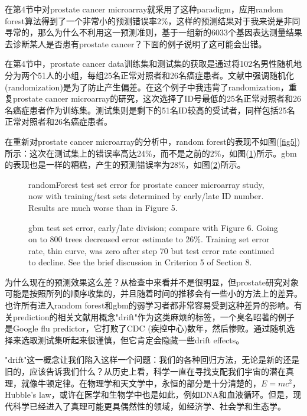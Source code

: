 \documentclass[lang=cn,11pt,a4paper,cite=authoryear]{elegantpaper}
\begin{document}
在第4节中对prostate cancer microarray就采用了这种paradigm，应用random forest算法得到了一个非常小的预测错误率2\%，这样的预测结果对于我来说是非同寻常的，那么为什么不利用这一预测准则，基于一组新的6033个基因表达测量结果去诊断某人是否患有prostate cancer？下面的例子说明了这可能会出错。

在第4节中，prostate cancer data训练集和测试集的获取是通过将102名男性随机地分为两个51人的小组，每组25名正常对照者和26名癌症患者。文献中强调随机化(randomization)是为了防止产生偏差。在这个例子中我违背了randomization，重复prostate cancer microarray的研究，这次选择了ID号最低的25名正常对照者和26名癌症患者作为训练集。测试集则是剩下的51名ID较高的受试者，同样包括25名正常对照者和26名癌症患者。

在重新对prostate cancer microarray的分析中，random forest的表现不如图(\ref{fig5})所示：这次在测试集上的错误率高达24\%，而不是之前的2\%，如图(\ref{fig8})所示。gbm的表现也是一样的糟糕，产生的预测错误率为28\%，如图(\ref{fig9})所示。
\begin{figure}[H]
		\centering
		\caption{randomForest test set error for prostate cancer microarray study, now with training/test sets determined by early/late ID number. Results are much worse than in Figure 5.}
		\label{fig8}
\end{figure}

\begin{figure}[H]
		\centering
		\caption{gbm test set error, early/late division; compare with Figure 6. Going on to 800 trees decreased error estimate to 26\%. Training set error rate, thin curve, was zero after step 70 but test error rate continued to decline. See the brief discussion in Criterion 5 of Section 8.}
		\label{fig9}
\end{figure}

为什么现在的预测效果这么差？从检查中来看并不是很明显，但prostate研究对象可能是按照所列的顺序收集的，并且随着时间的推移会有一些小的方法上的差异。也许所有进入random forest和gbm的弱学习者都非常容易受到这种差异的影响。有关prediction的相关文献用概念"drift"作为这类麻烦的标签，一个臭名昭著的例子是Google flu predictor，它打败了CDC (疾控中心)数年，然后惨败。通过随机选择来选取测试集听起来很谨慎，但它肯定会隐藏一些drift effects。

"drift"这一概念让我们陷入这样一个问题：我们的各种回归方法，无论是新的还是旧的，应该告诉我们什么？从历史上看，科学一直在寻找支配我们宇宙的潜在真理，就像牛顿定律。在物理学和天文学中，永恒的部分是十分清楚的，$E=mc^2$，Hubble's law，或许在医学和生物学中也是如此，例如DNA和血液循环。但是，现代科学已经进入了真理可能更具偶然性的领域，如经济学、社会学和生态学。
\end{document}
